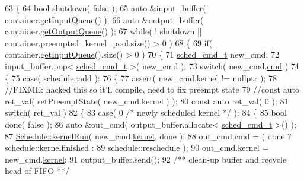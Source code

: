 \begin{DoxyCode}
63 \{
64    \textcolor{keywordtype}{bool} shutdown( \textcolor{keyword}{false} );
65    \textcolor{keyword}{auto} &input\_buffer( container.\hyperlink{classkernel__container_abcbec3854917b37bd6421b6b8ed2c2c0}{getInputQueue}() );
66    \textcolor{keyword}{auto} &output\_buffer( container.\hyperlink{classkernel__container_a64384e258fee9b664d164eb50baf33df}{getOutputQueue}() );
67    \textcolor{keywordflow}{while}( ! shutdown || container.preempted\_kernel\_pool.size() > 0 )
68    \{
69       \textcolor{keywordflow}{if}( container.\hyperlink{classkernel__container_abcbec3854917b37bd6421b6b8ed2c2c0}{getInputQueue}().size() > 0 )
70       \{
71          \hyperlink{structsched__cmd__t}{sched\_cmd\_t} new\_cmd;
72          input\_buffer.pop< \hyperlink{structsched__cmd__t}{sched\_cmd\_t} >( new\_cmd );
73          \textcolor{keywordflow}{switch}( new\_cmd.\hyperlink{structsched__cmd__t_ab4ecf8a7b468db75074c0ba1493caac7}{cmd} )
74          \{
75             \textcolor{keywordflow}{case}( schedule::add ):
76             \{
77                assert( new\_cmd.\hyperlink{structsched__cmd__t_a8f78af789430b7661f52de7365abcdbc}{kernel} != \textcolor{keyword}{nullptr} );
78                \textcolor{comment}{//FIXME: hacked this so it'll compile, need to fix preempt state}
79                \textcolor{comment}{//const auto ret\_val( setPreemptState( new\_cmd.kernel ) );}
80                \textcolor{keyword}{const} \textcolor{keyword}{auto} ret\_val( 0 );
81                \textcolor{keywordflow}{switch}( ret\_val )
82                \{
83                   \textcolor{keywordflow}{case}( 0 \textcolor{comment}{/* newly scheduled kernel */} ):
84                   \{
85                      \textcolor{keywordtype}{bool} done( \textcolor{keyword}{false} );
86                      \textcolor{keyword}{auto} &out\_cmd( output\_buffer.allocate< \hyperlink{structsched__cmd__t}{sched\_cmd\_t} >() );
87                      \hyperlink{class_schedule_acf28b4a4231e693585751a035873615c}{Schedule::kernelRun}( new\_cmd.\hyperlink{structsched__cmd__t_a8f78af789430b7661f52de7365abcdbc}{kernel}, done );
88                      out\_cmd.cmd            = ( done ? schedule::kernelfinished : 
89                                                        schedule::reschedule );
90                      out\_cmd.kernel         = new\_cmd.\hyperlink{structsched__cmd__t_a8f78af789430b7661f52de7365abcdbc}{kernel};
91                      output\_buffer.send();\textcolor{comment}{}
92 \textcolor{comment}{                     /** clean-up buffer and recycle head of FIFO **/}

\end{DoxyCode}
